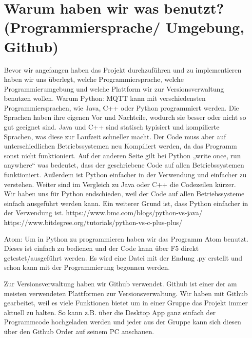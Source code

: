 


\section{Warum haben wir was benutzt? (Programmiersprache/ Umgebung, Github)}
Bevor wir angefangen haben das Projekt durchzuführen und zu implementieren haben wir uns überlegt, welche Programmiersprache, welche Programmierumgebung und welche Plattform wir zur Versionsverwaltung benutzen wollen.
Warum Python:
MQTT kann mit verschiedensten Programmiersprachen, wie Java, C++ oder Python programmiert werden.
Die Sprachen haben ihre eigenen Vor und Nachteile, wodurch sie besser oder nicht so gut geeignet sind.
Java und C++ sind statisch typisiert und kompilierte Sprachen, was diese zur Laufzeit schneller macht. Der Code muss aber auf unterschiedlichen Betriebssystemen neu Kompiliert werden, da das Programm sonst nicht funktioniert.
Auf der anderen Seite gilt bei Python „write once, run anywhere“ was bedeutet, dass der geschriebene Code auf allen Betriebssystemen funktioniert. 
Außerdem ist Python einfacher in der Verwendung und einfacher zu verstehen. Weiter sind im Vergleich zu Java oder C++ die Codezeilen kürzer.
Wir haben uns für Python endschieden, weil der Code auf allen Betriebssysteme einfach ausgeführt werden kann. Ein weiterer Grund ist, dass Python einfacher in der Verwendung ist.
https://www.bmc.com/blogs/python-vs-java/
https://www.bitdegree.org/tutorials/python-vs-c-plus-plus/

Atom:
Um in Python zu programmieren haben wir das Programm Atom benutzt. Dieses ist einfach zu bedienen und der Code kann über F5 direkt getestet/ausgeführt werden.
Es wird eine Datei mit der Endung .py erstellt und schon kann mit der Programmierung begonnen werden.


Zur Versionsverwaltung haben wir Github verwendet.
Github ist einer der am meisten verwendeten Plattformen zur Versionsverwaltung. Wir haben mit Github gearbeitet, weil es viele Funktionen bietet um in einer Gruppe das Projekt immer aktuell zu halten.
So kann z.B. über die Desktop App ganz einfach der Programmcode hochgeladen werden und jeder aus der Gruppe kann sich diesen über den Github Order auf seinem PC anschauen.

